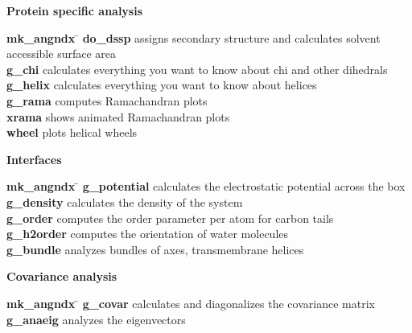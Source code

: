 \begin{description}
\item {\large\bf Protein specific analysis}
\vspace{-2ex}\begin{tabbing}
{\bf mk\_angndx} \= \kill
{\bf do\_dssp} \> assigns secondary structure and calculates solvent accessible surface area \\
{\bf g\_chi} \> calculates everything you want to know about chi and other dihedrals \\
{\bf g\_helix} \> calculates everything you want to know about helices \\
{\bf g\_rama} \> computes Ramachandran plots \\
{\bf xrama} \> shows animated Ramachandran plots \\
{\bf wheel} \> plots helical wheels \\
\end{tabbing}\vspace{-2ex}

\item {\large\bf Interfaces}
\vspace{-2ex}\begin{tabbing}
{\bf mk\_angndx} \= \kill
{\bf g\_potential} \> calculates the electrostatic potential across the box \\
{\bf g\_density} \> calculates the density of the system \\
{\bf g\_order} \> computes the order parameter per atom for carbon tails \\
{\bf g\_h2order} \> computes the orientation of water molecules \\
{\bf g\_bundle} \> analyzes bundles of axes, {\eg} transmembrane helices \\
\end{tabbing}\vspace{-2ex}

\item {\large\bf Covariance analysis}
\vspace{-2ex}\begin{tabbing}
{\bf mk\_angndx} \= \kill
{\bf g\_covar} \> calculates and diagonalizes the covariance matrix \\
{\bf g\_anaeig} \> analyzes the eigenvectors \\
\end{tabbing}\vspace{-2ex}


\end{description}
